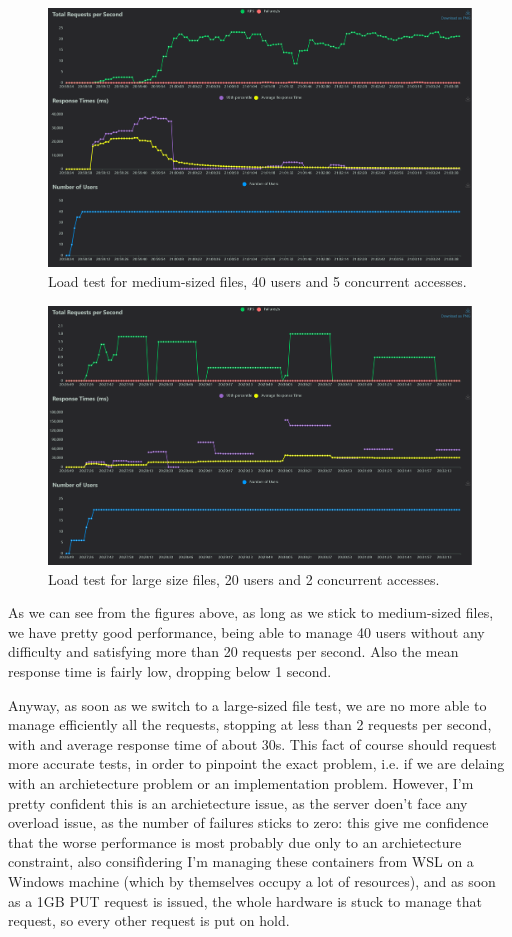 \documentclass{article}
\begin{document}
	\begin{figure}[h]
		\centering
		\includegraphics[width=0.7\linewidth]{total_requests_per_second_40user1mb}
		\caption{Load test for medium-sized files, 40 users and 5 concurrent accesses.}
		\label{fig:totalrequestspersecond40user1mb}
	\end{figure}
	
	\begin{figure}[h]
		\centering
		\includegraphics[width=0.7\linewidth]{response_times_(ms)_20users_1gb}
		\caption{Load test for large size files, 20 users and 2 concurrent accesses.}
		\label{fig:responsetimesms20users1gb}
	\end{figure}
	
	As we can see from the figures above, as long as we stick to medium-sized files, we have pretty good performance, being able to manage 40 users without any difficulty and satisfying more than 20 requests per second. Also the mean response time is fairly low, dropping below 1 second.
	
	Anyway, as soon as we switch to a large-sized file test, we are no more able to manage efficiently all the requests, stopping at less than 2 requests per second, with and average response time of about 30s. This fact of course should request more accurate tests, in order to pinpoint the exact problem, i.e. if we are delaing with an archietecture problem or an implementation problem. However, I'm pretty confident this is an archietecture issue, as the server doen't face any overload issue, as the number of failures sticks to zero: this give me confidence that the worse performance is most probably due only to an archietecture constraint, also consifìdering I'm managing these containers from WSL on a Windows machine (which by themselves occupy a lot of resources), and as soon as a 1GB PUT request is issued, the whole hardware is stuck to manage that request, so every other request is put on hold.
	
\end{document}
